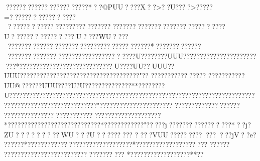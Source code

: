 {{{{{{{{{{{{{{{{{{{{{{{{{{{{{{{{{{{{{{{{{{{{{{{{{{{{{{{{{{{{{{{{{{{{{{{{{{{{{{{{{{{{{{{{{{{{{{{{{{{{{{{{{{{{{{{{{{{{{{{{{{{{{{{{{{{{{{{{{{{{{{{{{{{{{{{{{{{{{{{{{{{{{{{{{{{{{{{{{{{{{{{{{{{{{{{{{{{{{{{{{{{{{{{{{{{{{{{{{{{{{{{{{{{{{{{{{{{{{{{{{{{{{{{{{{{{{{{{{{{{{{{{{{{{{{{{{{{{{{{{{{{{{{{{{{{{{{{{{{{{{{{{{{{{{{{{{{{{{{{{{{{{{{{{{{{{{{{{{{{{{{{{{{{{{{{{{{{{{{{{{{{{{{{{{{{{{{{{{{{{{{{{{{{{{{{{{{{{{{{{{{{{{{{{{{{{{{{{{{{{{{{{{{{{{{{{{{{{{{{{{{{{{{{{{{{{{{{{{{{{{{{{{{{{{{{{{{{{{{{{{{{{{{{{{{{{{{{{{{{{{{{{{{{{{{{{{{{{{{{{{{{{{{{{{{{{{{{{{{{{{{{{{{{{{{{{{{{{{{{{{{{{{{{{{{{{{{{{{{{{{{{{{{{{{{{{{{{{{{{{{{{{{{{{{{{{{{{{{{{{{{{{{{{{{{{{{{{{{{{{{{{{{{{{{{{{{{{{{{{{{{{{{{{{{{{{{{{{{{{{{{{{{{{{{{{{{{{{{{{{{{{{{{{{{{{{{{{{{{{{{{{{{{{{{{{{{{{{{{{{{{{{{{{{{{{{{{{{{{{{{{{{{{{{{{{{{{{{{{{{{{{{{{{{{{{{{{{{{{{{{{{{{{{{{{{{{{{{{{{{{{{{{{{{{{{{{{{{{{{{{{{{{{{{{{{{{{{{{{{{{{{{{{{{{{{{{{{{{{{{{{{{{{{{{{{{{{{{{{{{{{{{{{{{{{{{{{{{{{{{{{{{{{{{{{{{{{{{{{{{{{{{{{{{{{{{{{{{{{{{{{{{{{{{{{{{{{{{{{{{{{{{{{{{{{{{{{{{{{{{{{{{{{{{{{{{{{{{{{{{{{{{{{{{{{{{{{{{{{{{{{{{{{{{{{{{{{{{{{{{{{{{{{{{{{{{{{{{{{{{{{{{{{{{{{{{{{{{{{{{{{{{{{{{{{{{{{{{{{{{{{{{{{{{{{{{{{{{{{{{{{{{{{{{{{{{{{{{{{{{{{{{{{{{{{{{{{{{{{{{{{{{{{{{{{{{{{{{{{{{{{{{{{{{{{{{{{{{{{{{{{{{{{{{{{{{{{{{{{{{{{{{{{{{{{{{{{{{{{{{{{{{{{{{{{{{{{{{{{{{{{{{{{{{{{{{{{{{{{{{???????????????????????*??@PUU????X??    >??U????>?????=????????????????????????????????????????????????????????????????????????????U????????????????U????WU?? ???????????? ??????????????????????????????*?????????????????????????????????????????????    ????U????????UUU?????????????????????????*??????? ?????  ????  ????????????U????UU??UUU??UUU????   ????   ????   ????   ???   ???   ???   ???   ???    ??   ???   "??    ?????????????    ???   ????   ????   ???UU@??    ??    ??UUU????U?U??????????????**????????U??????????????????????????????????????????????????????????????????????????????????????????????????????"??????????????? ??????? 
?????? ??????? ??????  
?????   ?????   ?????   
????    ?????????????? ??????? ??????* ??????? ??????? ??????????????* ??????  ??????"?????j?????????????????*??j?ZU??    ??    ??    ???WU???U??    ??? ?  ??? ?
 ???VUU????? ???? ???   ???jV??e?%
??????*?????? ??????????????????? ?????? *????? ?????????????  ???
??????
?????? ?????? ??????  ???????
??????????
*?????  ?????????????**?? }}}}}}}}}}}}}}}}}}}}}}}}}}}}}}}}}}}}}}}}}}}}}}}}}}}}}}}}}}}}}}}}}}}}}}}}}}}}}}}}}}}}}}}}}}}}}}}}}}}}}}}}}}}}}}}}}}}}}}}}}}}}}}}}}}}}}}}}}}}}}}}}}}}}}}}}}}}}}}}}}}}}}}}}}}}}}}}}}}}}}}}}}}}}}}}}}}}}}}}}}}}}}}}}}}}}}}}}}}}}}}}}}}}}}}}}}}}}}}}}}}}}}}}}}}}}}}}}}}}}}}}}}}}}}}}}}}}}}}}}}}}}}}}}}}}}}}}}}}}}}}}}}}}}}}}}}}}}}}}}}}}}}}}}}}}}}}}}}}}}}}}}}}}}}}}}}}}}}}}}}}}}}}}}}}}}}}}}}}}}}}}}}}}}}}}}}}}}}}}}}}}}}}}}}}}}}}}}}}}}}}}}}}}}}}}}}}}}}}}}}}}}}}}}}}}}}}}}}}}}}}}}}}}}}}}}}}}}}}}}}}}}}}}}}}}}}}}}}}}}}}}}}}}}}}}}}}}}}}}}}}}}}}}}}}}}}}}}}}}}}}}}}}}}}}}}}}}}}}}}}}}}}}}}}}}}}}}}}}}}}}}}}}}}}}}}}}}}}}}}}}}}}}}}}}}}}}}}}}}}}}}}}}}}}}}}}}}}}}}}}}}}}}}}}}}}}}}}}}}}}}}}}}}}}}}}}}}}}}}}}}}}}}}}}}}}}}}}}}}}}}}}}}}}}}}}}}}}}}}}}}}}}}}}}}}}}}}}}}}}}}}}}}}}}}}}}}}}}}}}}}}}}}}}}}}}}}}}}}}}}}}}}}}}}}}}}}}}}}}}}}}}}}}}}}}}}}}}}}}}}}}}}}}}}}}}}}}}}}}}}}}}}}}}}}}}}}}}}}}}}}}}}}}}}}}}}}}}}}}}}}}}}}}}}}}}}}}}}}}}}}}}}}}}}}}}}}}}}}}}}}}}}}}}}}}}}}}}}}}}}}}}}}}}}}}}}}}}}}}}}}}}}}}}}}}}}}}}}}}}}}}}}}}}}}}}}}}}}}}}}}}}}}}}}}}}}}}}}}}}}}}}}}}}}}}}}}}}}}}}}}}}}}}}}}}}}}}}}}}}}}}}}}}}}}}}}}}}}}}}}}}}}}}}}}}}}}}}}}}}}}}}}}}}}}}}}}}}}}}}}}}}}}}}}}}}}}}}}}}}}}}}}}}}}}}}}}}}}}}}}}}}}}}}}}}}}}}}}}}}}}}}}}}}}}}}}}}}}}}}}}}}}}}}}}}}}}}}}}}}}}}}}}}}}}}}}}}}}}}}}}}}}}}}}}}}}}}}}}}}}}}}}}}}}}}}}}}}}}}}}}}}}}}}}}}}}}}}}}}}
